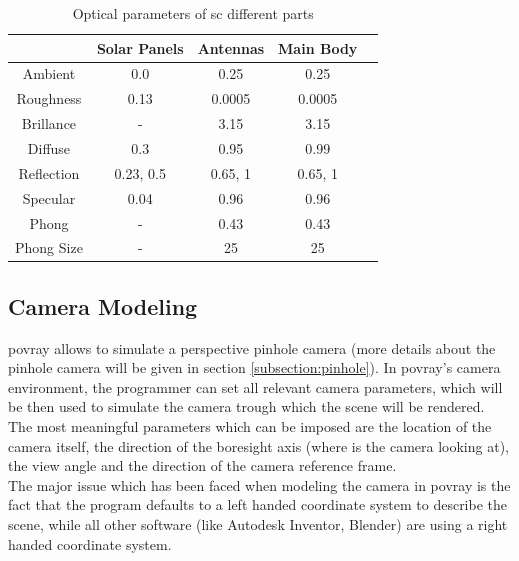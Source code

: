 \begin{table}[htbp]
  \centering
  \begin{tabular}{c cccc}
    \hline
    \hline
               & Solar Panels & Antennas  & Main Body \\
    \hline
    Ambient    & 0.0          & 0.25      & 0.25      \\
    Roughness  & 0.13         & 0.0005    & 0.0005    \\
    Brillance  & -            & 3.15      & 3.15      \\
    Diffuse    & 0.3          & 0.95      & 0.99      \\
    Reflection & {0.23, 0.5}  & {0.65, 1} & {0.65, 1} \\
    Specular   & 0.04         & 0.96      & 0.96      \\
    Phong      & -            & 0.43      & 0.43      \\
    Phong Size & -            & 25        & 25        \\
    \hline
    \hline
  \end{tabular}
  \caption{Optical parameters of \acrshort{sc} different parts}
  \label{tab:SCParameters}
\end{table}

\subsection{Camera Modeling}
\acrshort{povray} allows to simulate a perspective pinhole camera (more details about the pinhole camera will be given in section \ref{subsection:pinhole}). In \acrshort{povray}'s camera environment, the programmer can set all relevant camera parameters, which will be then used to simulate the camera trough which the scene will be rendered.
The most meaningful parameters which can be imposed are the location of the camera itself, the direction of the boresight axis (where is the camera looking at), the view angle and the direction of the camera reference frame.\\
The major issue which has been faced when modeling the camera in \acrshort{povray} is the fact that the program defaults to a left handed coordinate system to describe the scene, while all other software (like Autodesk Inventor, Blender) are using a right handed coordinate system.

